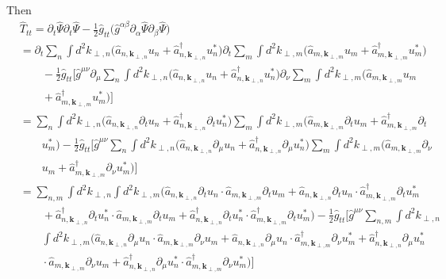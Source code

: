 \documentclass[english]{article}
\begin{document}
Then 
\begin{align*}
 & \hat{T}_{tt}=\partial_{t}\hat{\Psi}\partial_{t}\hat{\Psi}-\frac{1}{2}\hat{g}_{tt}\biggl(\hat{g}^{\alpha\beta}\partial_{\alpha}\hat{\Psi}\partial_{\beta}\hat{\Psi}\biggr)\\
 & =\partial_{t}\sum_{n}\int d^{2}k_{\perp,n}\biggl(\hat{a}_{n,\boldsymbol{k}_{\perp,n}}u_{n}+\hat{a}^{\dagger}_{n,\boldsymbol{k}_{\perp,n}}u^{*}_{n}\biggr)\partial_{t}\sum_{m}\int d^{2}k_{\perp,m}\biggl(\hat{a}_{m,\boldsymbol{k}_{\perp,m}}u_{m}+\hat{a}^{\dagger}_{m,\boldsymbol{k}_{\perp,m}}u^{*}_{m}\biggr)\\
 & \qquad-\frac{1}{2}\hat{g}_{tt}\biggl[\hat{g}^{\mu\nu}\partial_{\mu}\sum_{n}\int d^{2}k_{\perp,n}\biggl(\hat{a}_{n,\boldsymbol{k}_{\perp,n}}u_{n}+\hat{a}^{\dagger}_{n,\boldsymbol{k}_{\perp,n}}u^{*}_{n}\biggr)\partial_{\nu}\sum_{m}\int d^{2}k_{\perp,m}\biggl(\hat{a}_{m,\boldsymbol{k}_{\perp,m}}u_{m}\\
 & \qquad+\hat{a}^{\dagger}_{m,\boldsymbol{k}_{\perp,m}}u^{*}_{m}\biggr)\biggr]\\
 & =\sum_{n}\int d^{2}k_{\perp,n}\biggl(\hat{a}_{n,\boldsymbol{k}_{\perp,n}}\partial_{t}u_{n}+\hat{a}^{\dagger}_{n,\boldsymbol{k}_{\perp,n}}\partial_{t}u^{*}_{n}\biggr)\sum_{m}\int d^{2}k_{\perp,m}\biggl(\hat{a}_{m,\boldsymbol{k}_{\perp,m}}\partial_{t}u_{m}+\hat{a}^{\dagger}_{m,\boldsymbol{k}_{\perp,m}}\partial_{t}\\
 & \qquad u^{*}_{m}\biggr)-\frac{1}{2}\hat{g}_{tt}\biggl[\hat{g}^{\mu\nu}\sum_{n}\int d^{2}k_{\perp,n}\biggl(\hat{a}_{n,\boldsymbol{k}_{\perp,n}}\partial_{\mu}u_{n}+\hat{a}^{\dagger}_{n,\boldsymbol{k}_{\perp,n}}\partial_{\mu}u^{*}_{n}\biggr)\sum_{m}\int d^{2}k_{\perp,m}\biggl(\hat{a}_{m,\boldsymbol{k}_{\perp,m}}\partial_{\nu}\\
 & \qquad u_{m}+\hat{a}^{\dagger}_{m,\boldsymbol{k}_{\perp,m}}\partial_{\nu}u^{*}_{m}\biggr)\biggr]\\
 & =\sum_{n,m}\int d^{2}k_{\perp,n}\int d^{2}k_{\perp,m}\biggl(\hat{a}_{n,\boldsymbol{k}_{\perp,n}}\partial_{t}u_{n}\cdot\hat{a}_{m,\boldsymbol{k}_{\perp,m}}\partial_{t}u_{m}+\hat{a}_{n,\boldsymbol{k}_{\perp,n}}\partial_{t}u_{n}\cdot\hat{a}^{\dagger}_{m,\boldsymbol{k}_{\perp,m}}\partial_{t}u^{*}_{m}\\
 & \qquad+\hat{a}^{\dagger}_{n,\boldsymbol{k}_{\perp,n}}\partial_{t}u^{*}_{n}\cdot\hat{a}_{m,\boldsymbol{k}_{\perp,m}}\partial_{t}u_{m}+\hat{a}^{\dagger}_{n,\boldsymbol{k}_{\perp,n}}\partial_{t}u^{*}_{n}\cdot\hat{a}^{\dagger}_{m,\boldsymbol{k}_{\perp,m}}\partial_{t}u^{*}_{m}\biggr)-\frac{1}{2}\hat{g}_{tt}\biggl[\hat{g}^{\mu\nu}\sum_{n,m}\int d^{2}k_{\perp,n}\\
 & \qquad\int d^{2}k_{\perp,m}\biggl(\hat{a}_{n,\boldsymbol{k}_{\perp,n}}\partial_{\mu}u_{n}\cdot\hat{a}_{m,\boldsymbol{k}_{\perp,m}}\partial_{\nu}u_{m}+\hat{a}_{n,\boldsymbol{k}_{\perp,n}}\partial_{\mu}u_{n}\cdot\hat{a}^{\dagger}_{m,\boldsymbol{k}_{\perp,m}}\partial_{\nu}u^{*}_{m}+\hat{a}^{\dagger}_{n,\boldsymbol{k}_{\perp,n}}\partial_{\mu}u^{*}_{n}\\
 & \qquad\cdot\hat{a}_{m,\boldsymbol{k}_{\perp,m}}\partial_{\nu}u_{m}+\hat{a}^{\dagger}_{n,\boldsymbol{k}_{\perp,n}}\partial_{\mu}u^{*}_{n}\cdot\hat{a}^{\dagger}_{m,\boldsymbol{k}_{\perp,m}}\partial_{\nu}u^{*}_{m}\biggr)\biggr]
\end{align*}
\end{document}
